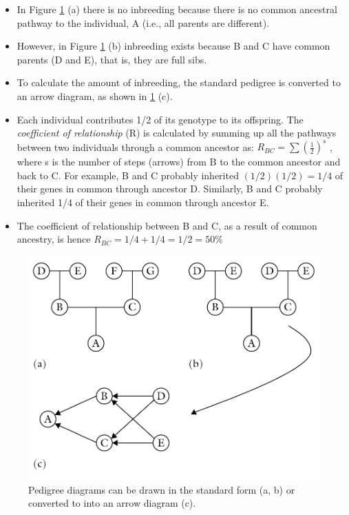 \documentclass[11pt,dvipsnames,ignorenonframetext,aspectratio=169]{beamer}
\providecommand{\tightlist}{%
  \setlength{\itemsep}{0pt}\setlength{\parskip}{0pt}}
\begin{document}
\begin{frame}{}
\protect\hypertarget{section-12}{}

\begin{itemize}
\tightlist
\item
  In Figure \ref{fig:inbreeding-coefficient} (a) there is no inbreeding
  because there is no common ancestral pathway to the individual, A
  (i.e., all parents are different).
\item
  However, in Figure \ref{fig:inbreeding-coefficient} (b) inbreeding
  exists because B and C have common parents (D and E), that is, they
  are full sibs.
\item
  To calculate the amount of inbreeding, the standard pedigree is
  converted to an arrow diagram, as shown in
  \ref{fig:inbreeding-coefficient} (c).
\item
  Each individual contributes 1/2 of its genotype to its offspring. The
  \emph{coefficient of relationship} (R) is calculated by summing up all
  the pathways between two individuals through a common ancestor as:
  \(R_{BC} = \sum{\left(\frac{1}{2}\right)^s}\) , where s is the number
  of steps (arrows) from B to the common ancestor and back to C. For
  example, B and C probably inherited \((1/2)(1/2) = 1/4\) of their
  genes in common through ancestor D. Similarly, B and C probably
  inherited 1/4 of their genes in common through ancestor E.
\item
  The coefficient of relationship between B and C, as a result of common
  ancestry, is hence \(R_{BC} = 1/4 + 1/4 = 1/2 = 50\%\)
\end{itemize}

\end{frame}

\begin{frame}{}
\protect\hypertarget{section-13}{}

\begin{figure}

{\centering \includegraphics[width=0.45\linewidth]{../images/arrow_diagram} 

}

\caption{Pedigree diagrams can be drawn in the standard form (a, b) or converted to into an arrow diagram (c).}\label{fig:inbreeding-coefficient}
\end{figure}

\end{frame}
\end{document}
